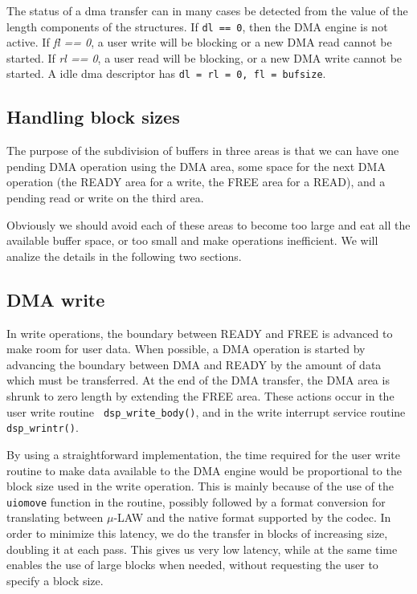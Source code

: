 \documentclass[11pt]{article}
\begin{document}
The status of a dma transfer can in many cases be detected from the
value of the length components of the structures. If {\tt dl == 0},
then the DMA engine is not active. If {\em fl == 0}, a user write will
be blocking or a new DMA read cannot be started.
If {\em rl == 0}, a user read will be blocking, or a new DMA write
cannot be started.  A idle dma descriptor has {\tt dl = rl = 0, fl
= bufsize}.

\subsection{Handling block sizes}

The purpose of the subdivision of buffers in three areas is that we
can have one pending DMA operation using the DMA area, some space for
the next DMA operation (the READY area for a write, the FREE area for
a READ), and a pending read or write on the third area.

Obviously we should avoid each of these areas to become too large and
eat all the available buffer space, or too small and make operations
inefficient. We will analize the details in the following two
sections.

\subsection{DMA write}

In write operations, the boundary between READY and FREE is advanced
to make room for user data. When possible, a DMA operation is
started by advancing the boundary between DMA and READY by the
amount of data which must be transferred. At the end of the DMA
transfer, the DMA area is shrunk to zero length by extending the
FREE area.  These actions occur in the user write routine {\tt
dsp\_write\_body()}, and in the write interrupt service routine
{\tt dsp\_wrintr()}.

By using a straightforward implementation, the time required for the
user write routine to make data available to the DMA engine would be
proportional to the block size used in the write operation. This is
mainly because of the use of the {\tt uiomove} function in the
routine, possibly followed by a format conversion for translating
between $\mu$-LAW and the native format supported by the codec.
In order to minimize this latency, we do the transfer in blocks of
increasing size, doubling it at each pass. This gives us very low
latency, while at the same time enables the use of large blocks when
needed, without requesting the user to specify a block size.
\end{document}

